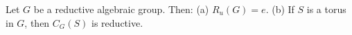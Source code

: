 Let $G$ be a reductive algebraic group. Then:
(a) $R_u(G) = e$.
(b) If $S$ is a torus in $G$, then $C_G(S)$ is reductive.
